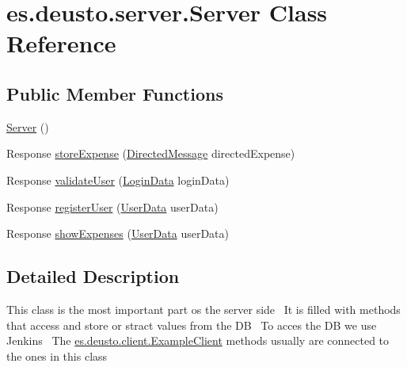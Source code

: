 \hypertarget{classes_1_1deusto_1_1server_1_1_server}{}\section{es.\+deusto.\+server.\+Server Class Reference}
\label{classes_1_1deusto_1_1server_1_1_server}
\subsection*{Public Member Functions}
\begin{DoxyCompactItemize}
\item 
\hyperlink{classes_1_1deusto_1_1server_1_1_server_a84f78162a65dd737f224eb2f94c43023}{Server} ()
\item 
Response \hyperlink{classes_1_1deusto_1_1server_1_1_server_a1a91c5bde8d3b39fc4292dc09d62b61b}{store\+Expense} (\hyperlink{classes_1_1deusto_1_1serialization_1_1_directed_message}{Directed\+Message} directed\+Expense)
\item 
Response \hyperlink{classes_1_1deusto_1_1server_1_1_server_a6e5f5013058ddaf970b0b21da2e32f66}{validate\+User} (\hyperlink{classes_1_1deusto_1_1serialization_1_1_login_data}{Login\+Data} login\+Data)
\item 
Response \hyperlink{classes_1_1deusto_1_1server_1_1_server_a12f56d7a970c3c41fefe8ed2db835c0a}{register\+User} (\hyperlink{classes_1_1deusto_1_1serialization_1_1_user_data}{User\+Data} user\+Data)
\item 
Response \hyperlink{classes_1_1deusto_1_1server_1_1_server_aa28b04cc2643cf60072fc2a680288cde}{show\+Expenses} (\hyperlink{classes_1_1deusto_1_1serialization_1_1_user_data}{User\+Data} user\+Data)
\end{DoxyCompactItemize}


\subsection{Detailed Description}
This class is the most important part os the server side~\newline
It is filled with methods that access and store or stract values from the DB~\newline
To acces the DB we use Jenkins~\newline
The \hyperlink{classes_1_1deusto_1_1client_1_1_example_client}{es.\+deusto.\+client.\+Example\+Client} methods usually are connected to the ones in this class 

